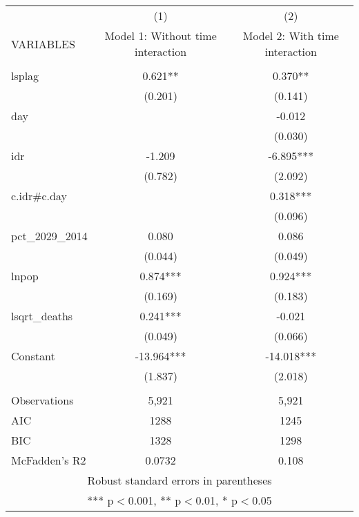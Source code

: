 \documentclass[]{article}
\begin{document}
\begin{tabular}{lcc} \hline
 & (1) & (2) \\
VARIABLES & Model 1: Without time interaction & Model 2: With time interaction \\ \hline
 &  &  \\
lsplag & 0.621** & 0.370** \\
 & (0.201) & (0.141) \\
day &  & -0.012 \\
 &  & (0.030) \\
idr & -1.209 & -6.895*** \\
 & (0.782) & (2.092) \\
c.idr\#c.day &  & 0.318*** \\
 &  & (0.096) \\
pct\_2029\_2014 & 0.080 & 0.086 \\
 & (0.044) & (0.049) \\
lnpop & 0.874*** & 0.924*** \\
 & (0.169) & (0.183) \\
lsqrt\_deaths & 0.241*** & -0.021 \\
 & (0.049) & (0.066) \\
Constant & -13.964*** & -14.018*** \\
 & (1.837) & (2.018) \\
 &  &  \\
Observations & 5,921 & 5,921 \\
AIC & 1288 & 1245 \\
BIC & 1328 & 1298 \\
 McFadden's R2 & 0.0732 & 0.108 \\ \hline
\multicolumn{3}{c}{ Robust standard errors in parentheses} \\
\multicolumn{3}{c}{ *** p$<$0.001, ** p$<$0.01, * p$<$0.05} \\
\end{tabular}
\end{document}
